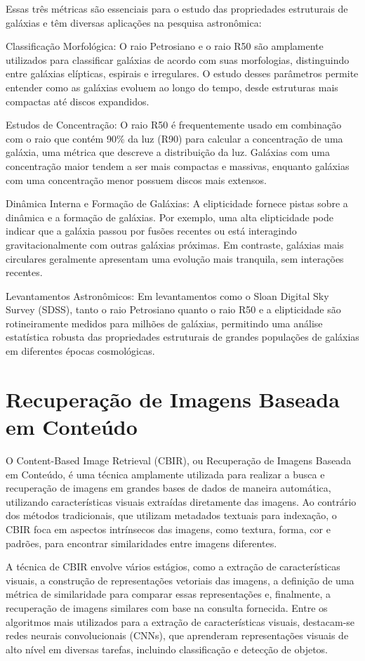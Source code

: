 Essas três métricas são essenciais para o estudo das propriedades estruturais de galáxias e têm diversas aplicações na pesquisa astronômica:

Classificação Morfológica: O raio Petrosiano e o raio R50 são amplamente utilizados para classificar galáxias de acordo com suas morfologias, distinguindo entre galáxias elípticas, espirais e irregulares. O estudo desses parâmetros permite entender como as galáxias evoluem ao longo do tempo, desde estruturas mais compactas até discos expandidos.

Estudos de Concentração: O raio R50 é frequentemente usado em combinação com o raio que contém 90\% da luz (R90) para calcular a concentração de uma galáxia, uma métrica que descreve a distribuição da luz. Galáxias com uma concentração maior tendem a ser mais compactas e massivas, enquanto galáxias com uma concentração menor possuem discos mais extensos.

Dinâmica Interna e Formação de Galáxias: A elipticidade fornece pistas sobre a dinâmica e a formação de galáxias. Por exemplo, uma alta elipticidade pode indicar que a galáxia passou por fusões recentes ou está interagindo gravitacionalmente com outras galáxias próximas. Em contraste, galáxias mais circulares geralmente apresentam uma evolução mais tranquila, sem interações recentes.

Levantamentos Astronômicos: Em levantamentos como o Sloan Digital Sky Survey (SDSS), tanto o raio Petrosiano quanto o raio R50 e a elipticidade são rotineiramente medidos para milhões de galáxias, permitindo uma análise estatística robusta das propriedades estruturais de grandes populações de galáxias em diferentes épocas cosmológicas.



\section{Recuperação de Imagens Baseada em Conteúdo}
O Content-Based Image Retrieval (CBIR), ou Recuperação de Imagens Baseada em Conteúdo, é uma técnica amplamente utilizada para realizar a busca e recuperação de imagens em grandes bases de dados de maneira automática, utilizando características visuais extraídas diretamente das imagens. Ao contrário dos métodos tradicionais, que utilizam metadados textuais para indexação, o CBIR foca em aspectos intrínsecos das imagens, como textura, forma, cor e padrões, para encontrar similaridades entre imagens diferentes.

A técnica de CBIR envolve vários estágios, como a extração de características visuais, a construção de representações vetoriais das imagens, a definição de uma métrica de similaridade para comparar essas representações e, finalmente, a recuperação de imagens similares com base na consulta fornecida. Entre os algoritmos mais utilizados para a extração de características visuais, destacam-se redes neurais convolucionais (CNNs), que aprenderam representações visuais de alto nível em diversas tarefas, incluindo classificação e detecção de objetos.

